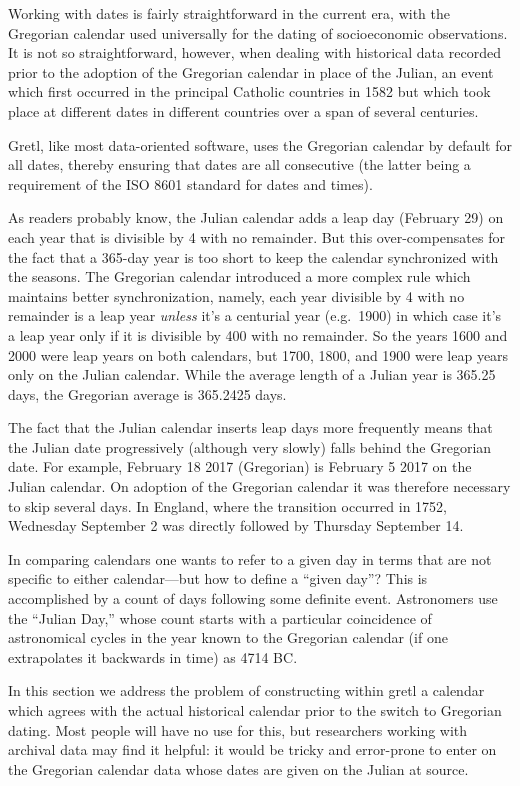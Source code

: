 Working with dates is fairly straightforward in the current era, with
the Gregorian calendar used universally for the dating of
socioeconomic observations. It is not so straightforward, however,
when dealing with historical data recorded prior to the adoption of
the Gregorian calendar in place of the Julian, an event which first
occurred in the principal Catholic countries in 1582 but which took
place at different dates in different countries over a span of several
centuries.

Gretl, like most data-oriented software, uses the Gregorian calendar
by default for all dates, thereby ensuring that dates are all
consecutive (the latter being a requirement of the ISO 8601 standard
for dates and times).

As readers probably know, the Julian calendar adds a leap day
(February 29) on each year that is divisible by 4 with no
remainder. But this over-compensates for the fact that a 365-day year
is too short to keep the calendar synchronized with the seasons. The
Gregorian calendar introduced a more complex rule which maintains
better synchronization, namely, each year divisible by 4 with no
remainder is a leap year \textit{unless} it's a centurial year (e.g.\
1900) in which case it's a leap year only if it is divisible by 400
with no remainder.  So the years 1600 and 2000 were leap years on both
calendars, but 1700, 1800, and 1900 were leap years only on the Julian
calendar. While the average length of a Julian year is 365.25 days,
the Gregorian average is 365.2425 days. 

The fact that the Julian calendar inserts leap days more frequently
means that the Julian date progressively (although very slowly) falls
behind the Gregorian date. For example, February 18 2017 (Gregorian)
is February 5 2017 on the Julian calendar. On adoption of the
Gregorian calendar it was therefore necessary to skip several days. In
England, where the transition occurred in 1752, Wednesday September 2
was directly followed by Thursday September 14.

In comparing calendars one wants to refer to a given day in terms that
are not specific to either calendar---but how to define a ``given
day''? This is accomplished by a count of days following some definite
event. Astronomers use the ``Julian Day,'' whose count starts with a
particular coincidence of astronomical cycles in the year known to the
Gregorian calendar (if one extrapolates it backwards in time) as 4714
BC.

In this section we address the problem of constructing within gretl a
calendar which agrees with the actual historical calendar prior to
the switch to Gregorian dating. Most people will have no use for
this, but researchers working with archival data may find it helpful:
it would be tricky and error-prone to enter on the Gregorian calendar
data whose dates are given on the Julian at source.

